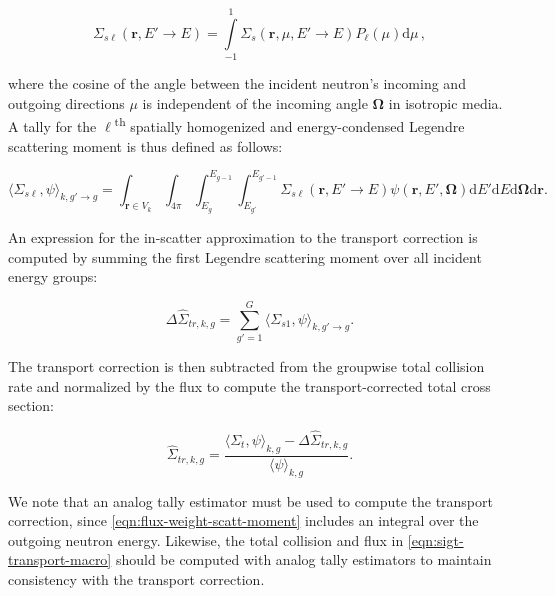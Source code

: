 \begin{equation}
\label{eqn:scatt-moment}
\Sigma_{s\ell}(\mathbf{r},E'\rightarrow E) = \displaystyle\int\limits_{-1}^{1} \Sigma_{s}(\mathbf{r},\mu,{E'\rightarrow E})P_{\ell}(\mu)\mathrm{d}\mu\,,
\end{equation}

\noindent where the cosine of the angle between the incident neutron's incoming and outgoing directions $\mu$ is independent of the incoming angle $\mathbf{\Omega}$ in isotropic media. A tally for the $\ell$\textsuperscript{th} spatially homogenized and energy-condensed Legendre scattering moment is thus defined as follows:

\begin{equation}
\label{eqn:flux-weight-scatt-moment}
\langle \Sigma_{s\ell}, \psi \rangle_{k,g'\rightarrow g} = \int_{\mathbf{r} \in V_{k}} \int_{4\pi} \int_{E_{g}}^{E_{g-1}} \int_{E_{g'}}^{E_{g'-1}} \Sigma_{s\ell}(\mathbf{r},E'\rightarrow E)\psi(\mathbf{r},E',\mathbf{\Omega}) \mathrm{d}E'\mathrm{d}E\mathrm{d}\mathbf{\Omega}\mathrm{d}\mathbf{r}.
\end{equation}

An expression for the in-scatter approximation\cite{yamamoto2008simplified} to the transport correction is computed by summing the first Legendre scattering moment over all incident energy groups:

\begin{equation}
\label{eqn:transport-corr-macro}
\Delta\hat{\Sigma}_{tr,k,g} = \displaystyle\sum\limits_{g'=1}^{G} \langle{\Sigma_{s1}, \psi \rangle_{k,g'\rightarrow g}}.
\end{equation}

\noindent The transport correction is then subtracted from the groupwise total collision rate and normalized by the flux to compute the transport-corrected total cross section:

\begin{equation}
\label{eqn:sigt-transport-macro}
\hat{\Sigma}_{tr,k,g} = \frac{\langle \Sigma_{t}, \psi \rangle_{k,g} - \Delta\hat{\Sigma}_{tr,k,g}}{\langle \psi \rangle_{k,g}}.
\end{equation}

We note that an analog tally estimator must be used to compute the transport correction, since \cref{eqn:flux-weight-scatt-moment} includes an integral over the outgoing neutron energy. Likewise, the total collision and flux in \cref{eqn:sigt-transport-macro} should be computed with analog tally estimators to maintain consistency with the transport correction.


